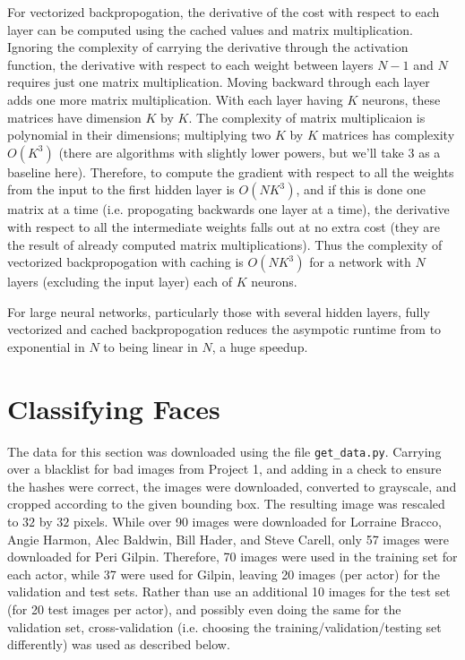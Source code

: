 \documentclass{article}
\begin{document}
   For vectorized backpropogation, the derivative of the cost with respect to each layer
   can be computed using the cached values and matrix multiplication. Ignoring the complexity
   of carrying the derivative through the activation function, the derivative with respect to
   each weight between layers $N-1$ and $N$ requires just one matrix multiplication.
   Moving backward through each layer adds one more matrix multiplication.
   With each layer having $K$ neurons, these matrices have dimension $K$ by $K$.
   The complexity of matrix multiplicaion is polynomial in their dimensions; multiplying two
   $K$ by $K$ matrices has complexity $O(K^3)$ (there are algorithms with slightly lower powers,
   but we'll take $3$ as a baseline here). Therefore, to compute the gradient with respect to all
   the weights from the input to the first hidden layer is $O(N K^3)$, and if this is done
   one matrix at a time (i.e. propogating backwards one layer at a time), the derivative
   with respect to all the intermediate weights falls out at no extra cost (they are the
   result of already computed matrix multiplications).
   Thus the complexity of vectorized backpropogation with caching is $O(N K^3)$ for a
   network with $N$ layers (excluding the input layer) each of $K$ neurons.

   For large neural networks, particularly those with several hidden layers, fully vectorized
   and cached backpropogation reduces the asympotic runtime from to exponential in $N$ to being
   linear in $N$, a huge speedup.


   \section{Classifying Faces}
   The data for this section was downloaded using the file \texttt{get\_data.py}. Carrying over
   a blacklist for bad images from Project 1, and adding in a check to ensure the hashes were
   correct, the images were downloaded, converted to grayscale, and cropped according to the given
   bounding box. The resulting image was rescaled to $32$ by $32$ pixels.
   While over 90 images were downloaded for Lorraine Bracco, Angie Harmon, Alec Baldwin,
   Bill Hader, and Steve Carell, only 57 images were downloaded for Peri Gilpin.
   Therefore, 70 images were used in the training set for each actor, while 37 were used for Gilpin,
   leaving 20 images (per actor) for the validation and test sets. Rather than use an
   additional 10 images for the test set (for 20 test images per actor), and possibly even doing
   the same for the validation set, cross-validation (i.e. choosing the training/validation/testing
   set differently) was used as described below.
\end{document}
